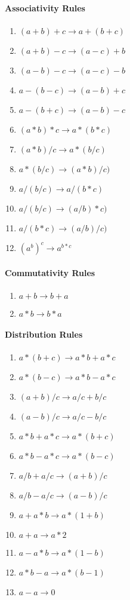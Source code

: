 \documentclass{article}
\begin{document}
\paragraph{Associativity Rules}
\begin{enumerate}
\item $(a+b)+c \rightarrow a+(b+c)$
\item $(a+b)-c \rightarrow (a-c)+b$
\item $(a-b)-c \rightarrow (a-c)-b$
\item $a-(b-c) \rightarrow (a-b)+c$
\item $a-(b+c) \rightarrow (a-b)-c$
\item $(a*b)*c \rightarrow a*(b*c)$
\item $(a*b)/c \rightarrow a*(b/c)$
\item $a*(b/c) \rightarrow (a*b)/c)$
\item $a/(b/c) \rightarrow a/(b*c)$
\item $a/(b/c) \rightarrow (a/b)*c)$
\item $a/(b*c) \rightarrow (a/b)/c)$
\item $(a^b)^c \rightarrow a^{b*c}$
\end{enumerate}

\paragraph{Commutativity Rules}
\begin{enumerate}
\item $a+b \rightarrow b+a$
\item $a*b \rightarrow b*a$
\end{enumerate}

\paragraph{Distribution Rules}
\begin{enumerate}
\item $a*(b+c) \rightarrow a*b+a*c$
\item $a*(b-c) \rightarrow a*b-a*c$
\item $(a+b)/c \rightarrow a/c+b/c$
\item $(a-b)/c \rightarrow a/c-b/c$
\item $a*b+a*c \rightarrow a*(b+c)$
\item $a*b-a*c \rightarrow a*(b-c)$
\item $a/b+a/c \rightarrow (a+b)/c$
\item $a/b-a/c \rightarrow (a-b)/c$
\item $a+a*b \rightarrow  a*(1+b)$
\item $a+a \rightarrow  a*2$
\item $a-a*b \rightarrow  a*(1-b)$
\item $a*b-a \rightarrow  a*(b-1)$
\item $a-a \rightarrow  0$
\end{enumerate}
\end{document}
